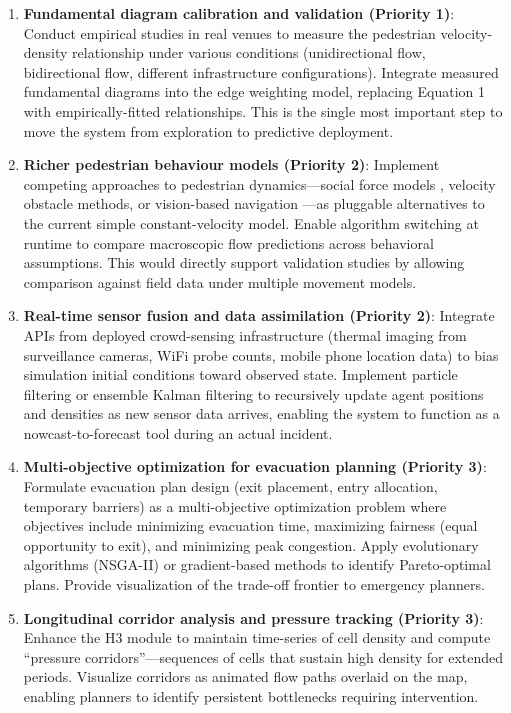 \documentclass[conference]{IEEEtran}
\begin{document}
\begin{enumerate}
\item \textbf{Fundamental diagram calibration and validation (Priority 1)}: Conduct empirical studies in real venues to measure the pedestrian velocity-density relationship under various conditions (unidirectional flow, bidirectional flow, different infrastructure configurations). Integrate measured fundamental diagrams into the edge weighting model, replacing Equation 1 with empirically-fitted relationships. This is the single most important step to move the system from exploration to predictive deployment.

\item \textbf{Richer pedestrian behaviour models (Priority 2)}: Implement competing approaches to pedestrian dynamics—social force models \cite{helbing2000simulating}, velocity obstacle methods, or vision-based navigation \cite{murrau2015large}—as pluggable alternatives to the current simple constant-velocity model. Enable algorithm switching at runtime to compare macroscopic flow predictions across behavioral assumptions. This would directly support validation studies by allowing comparison against field data under multiple movement models.

\item \textbf{Real-time sensor fusion and data assimilation (Priority 2)}: Integrate APIs from deployed crowd-sensing infrastructure (thermal imaging from surveillance cameras, WiFi probe counts, mobile phone location data) to bias simulation initial conditions toward observed state. Implement particle filtering or ensemble Kalman filtering to recursively update agent positions and densities as new sensor data arrives, enabling the system to function as a nowcast-to-forecast tool during an actual incident.

\item \textbf{Multi-objective optimization for evacuation planning (Priority 3)}: Formulate evacuation plan design (exit placement, entry allocation, temporary barriers) as a multi-objective optimization problem where objectives include minimizing evacuation time, maximizing fairness (equal opportunity to exit), and minimizing peak congestion. Apply evolutionary algorithms (NSGA-II) or gradient-based methods to identify Pareto-optimal plans. Provide visualization of the trade-off frontier to emergency planners.

\item \textbf{Longitudinal corridor analysis and pressure tracking (Priority 3)}: Enhance the H3 module to maintain time-series of cell density and compute ``pressure corridors''—sequences of cells that sustain high density for extended periods. Visualize corridors as animated flow paths overlaid on the map, enabling planners to identify persistent bottlenecks requiring intervention.


\end{enumerate}
\end{document}
